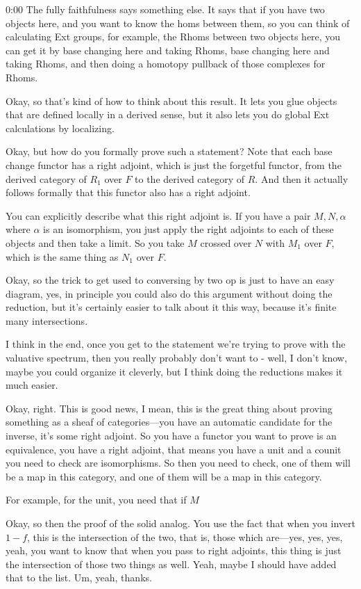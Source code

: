 \begin{unfinished}{0:00}
The fully faithfulness says something else. It says that if you have two objects here, and you want to know the homs between them, so you can think of calculating Ext groups, for example, the Rhoms between two objects here, you can get it by base changing here and taking Rhoms, base changing here and taking Rhoms, and then doing a homotopy pullback of those complexes for Rhoms.

Okay, so that's kind of how to think about this result. It lets you glue objects that are defined locally in a derived sense, but it also lets you do global Ext calculations by localizing.

Okay, but how do you formally prove such a statement? Note that each base change functor has a right adjoint, which is just the forgetful functor, from the derived category of $R_1$ over $F$ to the derived category of $R$. And then it actually follows formally that this functor also has a right adjoint.

You can explicitly describe what this right adjoint is. If you have a pair $M, N, \alpha$ where $\alpha$ is an isomorphism, you just apply the right adjoints to each of these objects and then take a limit. So you take $M$ crossed over $N$ with $M_1$ over $F$, which is the same thing as $N_1$ over $F$.

Okay, so the trick to get used to conversing by two op is just to have an easy diagram, yes, in principle you could also do this argument without doing the reduction, but it's certainly easier to talk about it this way, because it's finite many intersections.

I think in the end, once you get to the statement we're trying to prove with the valuative spectrum, then you really probably don't want to - well, I don't know, maybe you could organize it cleverly, but I think doing the reductions makes it much easier.

Okay, right. This is good news, I mean, this is the great thing about proving something as a sheaf of categories---you have an automatic candidate for the inverse, it's some right adjoint. So you have a functor you want to prove is an equivalence, you have a right adjoint, that means you have a unit and a counit you need to check are isomorphisms. So then you need to check, one of them will be a map in this category, and one of them will be a map in this category.

For example, for the unit, you need that if $M$

Okay, so then the proof of the solid analog. You use the fact that when you invert $1 - f$, this is the intersection of the two, that is, those which are---yes, yes, yes, yeah, you want to know that when you pass to right adjoints, this thing is just the intersection of those two things as well. Yeah, maybe I should have added that to the list. Um, yeah, thanks.


\end{unfinished}
